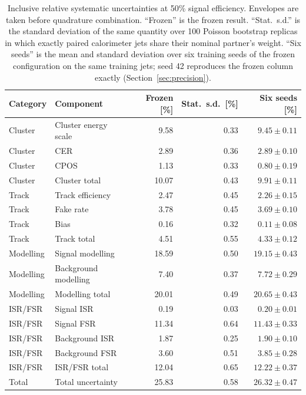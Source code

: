 \begin{table}[tbp]
\centering
\caption{Inclusive relative systematic uncertainties at 50\% signal efficiency. Envelopes are taken before quadrature combination. ``Frozen'' is the frozen result. ``Stat.\ s.d.'' is the standard deviation of the same quantity over 100 Poisson bootstrap replicas in which exactly paired calorimeter jets share their nominal partner's weight. ``Six seeds'' is the mean and standard deviation over six training seeds of the frozen configuration on the same training jets; seed 42 reproduces the frozen column exactly (Section~\ref{sec:precision}).}
\label{tab:inclusive-systematics-wp50}
\begin{tabular}{llrrr}
\toprule
Category & Component & Frozen [\%] & Stat.\ s.d.\ [\%] & Six seeds [\%] \\
\midrule
Cluster & Cluster energy scale & 9.58 & 0.33 & $9.45 \pm 0.11$ \\
Cluster & CER & 2.89 & 0.36 & $2.89 \pm 0.10$ \\
Cluster & CPOS & 1.13 & 0.33 & $0.80 \pm 0.19$ \\
Cluster & Cluster total & 10.07 & 0.43 & $9.91 \pm 0.11$ \\
Track & Track efficiency & 2.47 & 0.45 & $2.26 \pm 0.15$ \\
Track & Fake rate & 3.78 & 0.45 & $3.69 \pm 0.10$ \\
Track & Bias & 0.16 & 0.32 & $0.11 \pm 0.08$ \\
Track & Track total & 4.51 & 0.55 & $4.33 \pm 0.12$ \\
Modelling & Signal modelling & 18.59 & 0.50 & $19.15 \pm 0.43$ \\
Modelling & Background modelling & 7.40 & 0.37 & $7.72 \pm 0.29$ \\
Modelling & Modelling total & 20.01 & 0.49 & $20.65 \pm 0.43$ \\
ISR/FSR & Signal ISR & 0.19 & 0.03 & $0.20 \pm 0.01$ \\
ISR/FSR & Signal FSR & 11.34 & 0.64 & $11.43 \pm 0.33$ \\
ISR/FSR & Background ISR & 1.87 & 0.25 & $1.90 \pm 0.10$ \\
ISR/FSR & Background FSR & 3.60 & 0.51 & $3.85 \pm 0.28$ \\
ISR/FSR & ISR/FSR total & 12.04 & 0.65 & $12.22 \pm 0.37$ \\
Total & Total uncertainty & 25.83 & 0.58 & $26.32 \pm 0.47$ \\
\bottomrule
\end{tabular}
\end{table}
